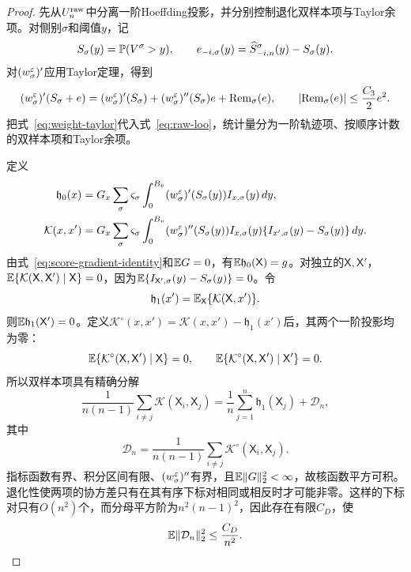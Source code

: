 \begin{proof}
先从$U_n^{\rm raw}$中分离一阶Hoeffding投影，并分别控制退化双样本项与Taylor余项。对侧别$\sigma$和阈值$y$，记
\[
 S_\sigma(y)=\mathbb P(V^\sigma>y),
 \qquad
 e_{-i,\sigma}(y)=\widehat S_{-i,n}^\sigma(y)-S_\sigma(y).
\]
对$(w_\sigma^\varepsilon)'$应用Taylor定理，得到
\begin{equation}\label{eq:weight-taylor}
 (w_\sigma^\varepsilon)'(S_\sigma+e)
 =(w_\sigma^\varepsilon)'(S_\sigma)
 +(w_\sigma^\varepsilon)''(S_\sigma)e
 +\operatorname{Rem}_\sigma(e),
 \qquad
 \lvert\operatorname{Rem}_\sigma(e)\rvert\le\frac{C_3}{2}e^2.
\end{equation}
把式~\eqref{eq:weight-taylor}代入式~\eqref{eq:raw-loo}，统计量分为一阶轨迹项、按顺序计数的双样本项和Taylor余项。

定义
\begin{align*}
 \mathfrak h_0(x)
 &=G_x\sum_\sigma \varsigma_\sigma
 \int_0^{B_v}(w_\sigma^\varepsilon)'(S_\sigma(y))I_{x,\sigma}(y)\,dy,\\
 \mathcal K(x,x')
 &=G_x\sum_\sigma \varsigma_\sigma
 \int_0^{B_v}(w_\sigma^\varepsilon)''(S_\sigma(y))
 I_{x,\sigma}(y)\{I_{x',\sigma}(y)-S_\sigma(y)\}\,dy.
\end{align*}
由式~\eqref{eq:score-gradient-identity}和$\mathbb E G=0$，有$\mathbb E\mathfrak h_0(\mathsf X)=g$。对独立的$\mathsf X,\mathsf X'$，
$\mathbb E\{\mathcal K(\mathsf X,\mathsf X')\mid\mathsf X\}=0$，因为$\mathbb E\{I_{\mathsf X',\sigma}(y)-S_\sigma(y)\}=0$。令
\[
 \mathfrak h_1(x')=\mathbb E_{\mathsf X}\{\mathcal K(\mathsf X,x')\}.
\]
则$\mathbb E\mathfrak h_1(\mathsf X')=0$。定义$\mathcal K^\circ(x,x')=\mathcal K(x,x')-\mathfrak h_1(x')$后，其两个一阶投影均为零：
\[
 \mathbb E\{\mathcal K^\circ(\mathsf X,\mathsf X')\mid\mathsf X\}=0,
 \qquad
 \mathbb E\{\mathcal K^\circ(\mathsf X,\mathsf X')\mid\mathsf X'\}=0.
\]
所以双样本项具有精确分解
\begin{equation}\label{eq:ordered-hoeffding}
 \frac{1}{n(n-1)}\sum_{i\ne j}\mathcal K(\mathsf X_i,\mathsf X_j)
 =\frac1n\sum_{j=1}^{n}\mathfrak h_1(\mathsf X_j)
 +\mathcal D_n,
\end{equation}
其中
\[
 \mathcal D_n=\frac{1}{n(n-1)}\sum_{i\ne j}\mathcal K^\circ(\mathsf X_i,\mathsf X_j).
\]
指标函数有界、积分区间有限、$(w_\sigma^\varepsilon)''$有界，且$\mathbb E\lVert G\rVert_2^2<\infty$，故核函数平方可积。退化性使两项的协方差只有在其有序下标对相同或相反时才可能非零。这样的下标对只有$O(n^2)$个，而分母平方阶为$n^2(n-1)^2$，因此存在有限$C_D$，使
\begin{equation}\label{eq:degenerate-remainder}
 \mathbb E\lVert\mathcal D_n\rVert_2^2\le\frac{C_D}{n^2}.
\end{equation}


\end{proof}

